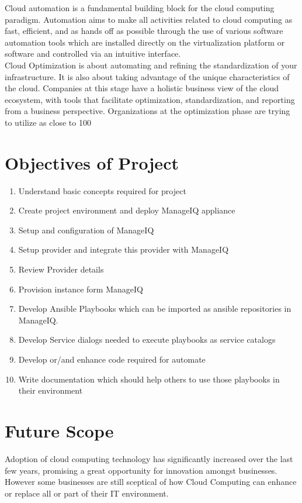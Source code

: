 \documentclass[a4paper,12pt]{report}
\begin{document}
Cloud automation is a fundamental building block for the cloud computing paradigm. Automation aims to make all activities related to cloud computing as fast, efficient, and as hands off as possible through the use of various software automation tools which are installed directly on the virtualization platform or software and controlled via an intuitive interface.\\

Cloud Optimization is about automating and refining the standardization of your infrastructure. It is also about taking advantage of the unique characteristics of the cloud. Companies at this stage have a holistic business view of the cloud ecosystem, with tools that facilitate optimization, standardization, and reporting from a business perspective. Organizations at the optimization phase are trying to utilize as close to 100%


\chapter{Objectives of Project}
\begin{enumerate}
	\item Understand basic concepts required for project
	\item Create project environment and deploy ManageIQ appliance
	\item Setup and configuration of ManageIQ 
	\item Setup provider and integrate 	this provider with ManageIQ
	\item Review Provider details 
	\item Provision instance form ManageIQ
	\item Develop Ansible Playbooks which can be imported as ansible repositories in ManageIQ.
	\item Develop Service dialogs needed to execute playbooks as service catalogs
	\item Develop or/and enhance code required for automate
	\item Write documentation which should help others to use those playbooks in their environment
\end{enumerate}

\chapter{Future Scope}
Adoption of cloud computing technology has significantly increased over the last few years, promising a great opportunity for innovation amongst businesses. However some businesses are still sceptical of how Cloud Computing can enhance or replace all or part of their IT environment.\\
\end{document}
